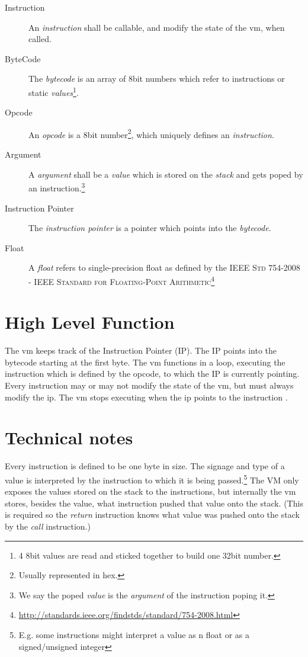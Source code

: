 \documentclass[10pt,a4paper]{article}
\begin{document}
\begin{description}
		\item[Instruction] An \textit{instruction} shall be callable, and modify the state of the vm, when called.
			
		\item[ByteCode] The \textit{bytecode} is an array of 8bit numbers which refer to instructions or static \textit{values}\footnote{4 8bit values are read and sticked together to build one 32bit number.}.	
		
		\item[Opcode] An \textit{opcode} is a 8bit number\footnote{Usually represented in hex.}, which uniquely defines an \textit{instruction}.
		
 		\item[Argument]A \textit{argument} shall be a \textit{value} which is stored on the \textit{stack} and gets poped by an instruction.\footnote{We say the poped \textit{value} is the \textit{argument} of the instruction poping it.}
 		
		\item[Instruction Pointer] The \textit{instruction pointer} is a pointer which points into the \textit{bytecode}. 	
		
		\item[Float] A \textit{float} refers to single-precision float	as defined by the \textsc{IEEE Std 754-2008 - IEEE Standard for Floating-Point Arithmetic}\footnote{\url{http://standards.ieee.org/findstds/standard/754-2008.html}}
 		

	\end{description}
	\section{High Level Function}
	\label{high_level_function}	
	
	The vm keeps track of the Instruction Pointer (IP). The IP points into the bytecode starting at the first byte. The vm functions in a loop, executing the instruction which is defined by the opcode, to which the IP is currently pointing. Every instruction may or may not modify the state of the vm, but must always modify the ip. The vm stops executing when the ip points to the instruction .
	
	\section{Technical notes}
	\label{technical_notes}	
	Every instruction is defined to be one byte in size. The signage and type of a value is interpreted by the instruction to which it is being passed.\footnote{E.g. some instructions might interpret a value as n float or as a signed/unsigned integer} The VM only exposes the values stored on the stack to the instructions, but internally the vm stores, besides the value, what instruction pushed that value onto the stack. (This is required so the \textit{return} instruction knows what value was pushed onto the stack by the \textit{call} instruction.)
	
\end{document}
